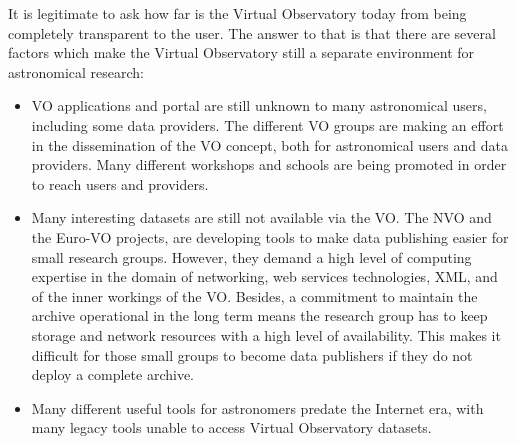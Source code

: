 	 It is legitimate to ask how far is the Virtual Observatory
	today from being completely transparent to the user. The answer
	to that is that there are several factors which make the
	Virtual Observatory still a separate environment for
	astronomical research:

	\begin{itemize}
		\item VO applications and portal are still unknown to many
		astronomical users, including some data providers. The
		different VO groups are making an effort in the
		dissemination of the VO concept, both for astronomical
		users and data providers. Many different workshops and
		schools are being promoted in order to reach users and
		providers.
		
		 \item Many interesting datasets are still not available
		via the VO. The NVO and the Euro-VO projects, are
		developing tools to make data publishing easier for small
		research groups. However, they demand a high level of
		computing expertise in the domain of networking, web
		services technologies, XML, and of the inner workings of
		the VO. Besides, a commitment to maintain the archive
		operational in the long term means the research group has
		to keep storage and network resources with a high level of
		availability. This makes it difficult for those small
		groups to become data publishers if they do not deploy a
		complete archive.
		
		 \item Many different useful tools for astronomers predate
		the Internet era, with many legacy tools unable to access
		Virtual Observatory datasets.
	\end{itemize}

%
%		
%		

